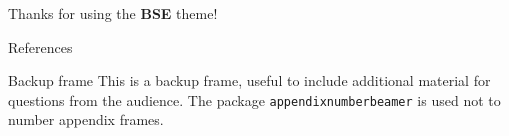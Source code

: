 \documentclass{beamer}
\begin{document}
    \begin{frame}[focus]
        Thanks for using the \textbf{BSE} theme!
    \end{frame}
    
    \appendix
    \begin{frame}{References}
        \nocite{*}
        
        
    \end{frame}
    
    \begin{frame}{Backup frame}
        This is a backup frame, useful to include additional material for questions from the audience.
        \vfill
        The package \texttt{appendixnumberbeamer} is used not to number appendix frames.
    \end{frame}
\end{document}
